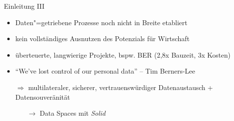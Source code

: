 \begin{frame}{Einleitung III}
    \begin{itemize}
        \item Daten"=getriebene Prozesse noch nicht in Breite etabliert
        \item kein vollständiges Ausnutzen des Potenzials für Wirtschaft

        \pause
        \item überteuerte, langwierige Projekte, bspw. BER (2,8x Bauzeit, 3x Kosten)~\cite{stalinskiBestBERZahlen2020}
        
        \pause
        \item \enquote{We've \alert{lost control} of our personal data} -- Tim Berners-Lee~\cite{berners-leeThreeChallengesWeb2017}
        
        \pause
        \item[$\Rightarrow$] multilateraler, sicherer, vertrauenswürdiger Datenaustausch + Datensouveränität~\cite{mollerIndustrialDataEcosystems2024}
        \pause
        \begin{itemize}
            \item[$\to$] Data Spaces mit \emph{Solid}~\cite{mecklerWebLinkedData2023}
        \end{itemize}
    \end{itemize}
\end{frame}
